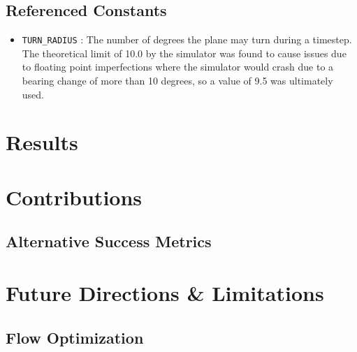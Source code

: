 \documentclass[10pt]{article}
\newcommand{\ms}[1] {
  \texttt{#1}
}
\begin{document}
\subsection{Referenced Constants}
\begin{itemize}
  \item \ms{TURN\_RADIUS}: The number of degrees the plane may turn during a timestep. The theoretical limit of 
    10.0 by the simulator was found to cause issues due to floating point imperfections where the simulator would
    crash due to a bearing change of more than 10 degrees, so a value of 9.5 was ultimately used.
\end{itemize}


\newpage
\section{Results}

\newpage
\section{Contributions}

\subsection{Alternative Success Metrics}

\newpage
\section{Future Directions \& Limitations}

\subsection{Flow Optimization}
\end{document}
